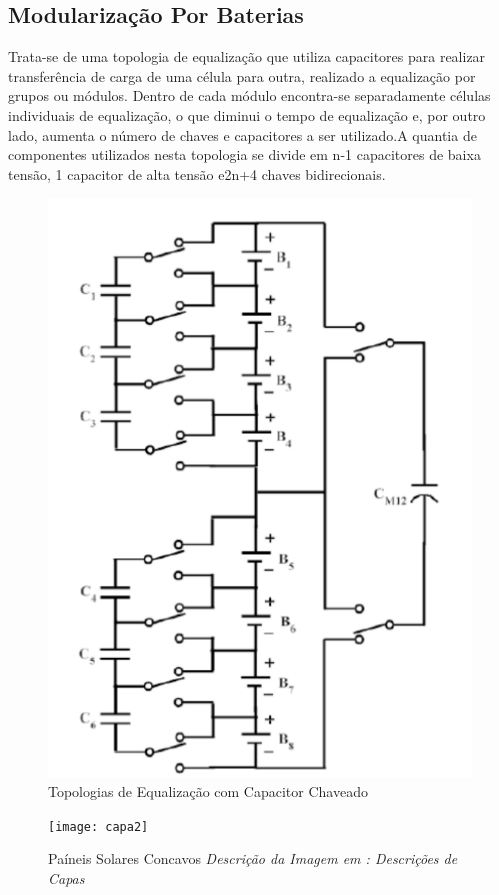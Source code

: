 \documentclass[11pt, a4paper, oneside]{article}
\begin{document}
\newpage 

\subsection{Modularização Por Baterias}
Trata-se de uma topologia de equalização que utiliza capacitores para
realizar transferência de carga de uma célula para outra, realizado a equalização
por grupos ou módulos. Dentro de cada módulo encontra-se separadamente
células individuais de equalização, o que diminui o tempo de equalização e, por
outro lado, aumenta o número de chaves e capacitores a ser utilizado.A quantia de
componentes utilizados nesta topologia se divide em n-1 capacitores de baixa
tensão, 1 capacitor de alta tensão e2n+4 chaves bidirecionais.

\begin{figure}[h!]
\centering
\includegraphics[width=0.6\linewidth]{modulacao_por_baterias}
\caption{Topologias de Equalização com Capacitor Chaveado \cite{energy_figure}}
\label{fig:estrutura_equalizador_passivo_ apacitor}
\end{figure}

 	\newpage
	\thispagestyle{empty}
	\clearpage
	\begin{figure}
		\centering
		\texttt{[image: capa2]}
		\label{fig:adc_dac_ideal}
		\caption{Paíneis Solares Concavos \textit{Descrição da Imagem em : Descrições de Capas}}
	\end{figure}
	\clearpage
	\newpage
\end{document}

